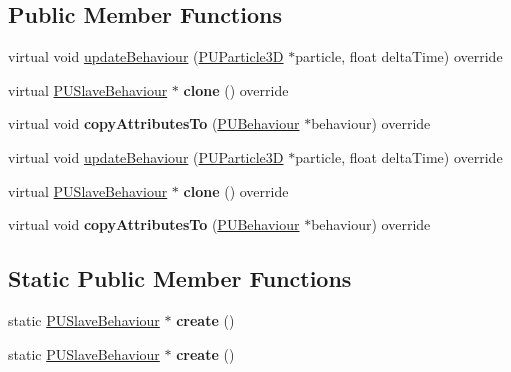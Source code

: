 \subsection*{Public Member Functions}
\begin{DoxyCompactItemize}
\item 
virtual void \hyperlink{classPUSlaveBehaviour_a78a522da7be0a4780b790313f3cb193f}{update\+Behaviour} (\hyperlink{structPUParticle3D}{P\+U\+Particle3D} $\ast$particle, float delta\+Time) override
\item 
\mbox{\label{classPUSlaveBehaviour_abbfc82e4e3a7138f6c9079df1f681a7e}} 
virtual \hyperlink{classPUSlaveBehaviour}{P\+U\+Slave\+Behaviour} $\ast$ {\bfseries clone} () override
\item 
\mbox{\label{classPUSlaveBehaviour_aff1f058d49b4cb5101ca74a17e3bb74a}} 
virtual void {\bfseries copy\+Attributes\+To} (\hyperlink{classPUBehaviour}{P\+U\+Behaviour} $\ast$behaviour) override
\item 
virtual void \hyperlink{classPUSlaveBehaviour_abc928fb9c94c37ec534007ef2eda06fe}{update\+Behaviour} (\hyperlink{structPUParticle3D}{P\+U\+Particle3D} $\ast$particle, float delta\+Time) override
\item 
\mbox{\label{classPUSlaveBehaviour_a029b93bb395f724ef81600fb1cbaa9fe}} 
virtual \hyperlink{classPUSlaveBehaviour}{P\+U\+Slave\+Behaviour} $\ast$ {\bfseries clone} () override
\item 
\mbox{\label{classPUSlaveBehaviour_a21f4cfa63f20334e419045aed2f4c66e}} 
virtual void {\bfseries copy\+Attributes\+To} (\hyperlink{classPUBehaviour}{P\+U\+Behaviour} $\ast$behaviour) override
\end{DoxyCompactItemize}
\subsection*{Static Public Member Functions}
\begin{DoxyCompactItemize}
\item 
\mbox{\label{classPUSlaveBehaviour_a87455109229359ca7e6cace4061a3d0e}} 
static \hyperlink{classPUSlaveBehaviour}{P\+U\+Slave\+Behaviour} $\ast$ {\bfseries create} ()
\item 
\mbox{\label{classPUSlaveBehaviour_afc74a6627d2b8f45907a1c86652113c3}} 
static \hyperlink{classPUSlaveBehaviour}{P\+U\+Slave\+Behaviour} $\ast$ {\bfseries create} ()
\end{DoxyCompactItemize}
